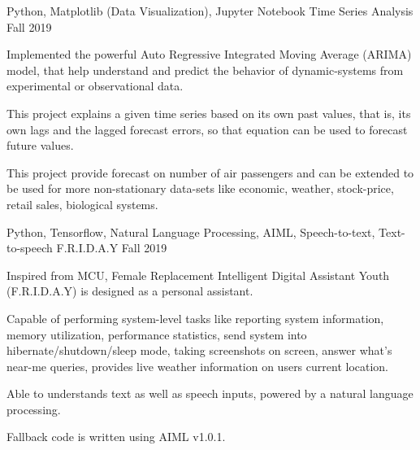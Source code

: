 \begin{cventries}
  \cventry
    {Python, Matplotlib (Data Visualization), Jupyter Notebook} %
    {Time Series Analysis} %
    {} %
    {Fall 2019} %
    {
      \begin{cvitems} %
        \item {Implemented the powerful Auto Regressive Integrated Moving Average (ARIMA) model, that help understand and predict the behavior of dynamic-systems from experimental or observational data.}
        \item {This project explains a given time series based on its own past values, that is, its own lags and the lagged forecast errors, so that equation can be used to forecast future values.}
        \item {This project provide forecast on number of air passengers and can be extended to be used for more non-stationary data-sets like economic, weather, stock-price, retail sales, biological systems.}
      \end{cvitems}
    }

  \cventry
    {Python, Tensorflow, Natural Language Processing, AIML, Speech-to-text, Text-to-speech} %
    {F.R.I.D.A.Y} %
    {} %
    {Fall 2019} %
    {
      \begin{cvitems} %
        \item {Inspired from MCU, Female Replacement Intelligent Digital Assistant Youth (F.R.I.D.A.Y) is designed as a personal assistant.}
        \item {Capable of performing system-level tasks like reporting system information, memory utilization, performance statistics, send system into hibernate/shutdown/sleep mode, taking screenshots on screen, answer what's near-me queries, provides live weather information on users current location.}
        \item {Able to understands text as well as speech inputs, powered by a natural language processing.}
        \item {Fallback code is written using AIML v1.0.1.}
      \end{cvitems}
    }

\end{cventries}
